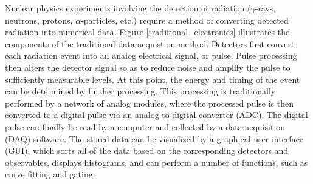 Nuclear physics experiments involving the detection of radiation ($\gamma$-rays, neutrons, protons, $\alpha$-particles, etc.) require a method of converting detected radiation into numerical data. 
Figure \ref{traditional_electronics} illustrates the components of the traditional data acquistion method. Detectors first convert each radiation event into an analog electrical signal, or pulse. Pulse processing then alters the detector signal so as to reduce noise and amplify the pulse to sufficiently measurable levels. At this point, the energy and timing of the event can be determined by further processing. This processing is traditionally performed by a network of analog modules, where the processed pulse is then converted to a digital pulse via an analog-to-digital converter (ADC). The digital pulse can finally be read by a computer and collected by a data acquisition (DAQ) software. The stored data can be visualized by a graphical user interface (GUI), which sorts all of the data based on the corresponding detectors and observables, displays histograms, and can perform a number of functions, such as curve fitting and gating.

